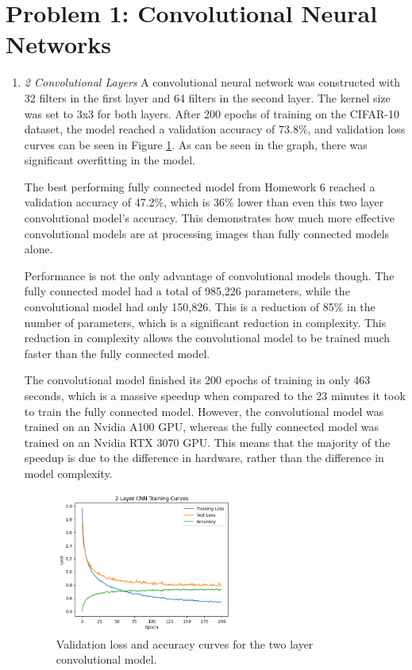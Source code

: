 \documentclass{article}
\begin{document}


\section{Problem 1: Convolutional Neural Networks}
\begin{enumerate}[label=\alph*. ]
    \item \textit{2 Convolutional Layers}
     A convolutional neural network was constructed with 32 filters in the first layer and 64 filters in the second layer. The kernel size was set to 3x3 for both layers. After 200 epochs of training on the CIFAR-10 dataset, the model reached a validation accuracy of 73.8\%, and validation loss curves can be seen in Figure \ref{fig:conv_loss_a}. As can be seen in the graph, there was significant overfitting in the model.
     
     The best performing fully connected model from Homework 6 reached a validation accuracy of 47.2\%, which is 36\% lower than even this two layer convolutional model's accuracy. This demonstrates how much more effective convolutional models are at processing images than fully connected models alone. 
     
     Performance is not the only advantage of convolutional models though. The fully connected model had a total of 985,226 parameters, while the convolutional model had only 150,826. This is a reduction of 85\% in the number of parameters, which is a significant reduction in complexity. This reduction in complexity allows the convolutional model to be trained much faster than the fully connected model. 
     
     The convolutional model finished its 200 epochs of training in only 463 seconds, which is a massive speedup when compared to the 23 minutes it took to train the fully connected model. However, the convolutional model was trained on an Nvidia A100 GPU, whereas the fully connected model was trained on an Nvidia RTX 3070 GPU. This means that the majority of the speedup is due to the difference in hardware, rather than the difference in model complexity.

     \begin{figure}[ht]
        \centering
        \includegraphics[width=0.55\textwidth]{output/graph1_a.png}
        \caption{Validation loss and accuracy curves for the two layer convolutional model.}
        \label{fig:conv_loss_a}
    \end{figure}
     

\end{enumerate}
\end{document}
